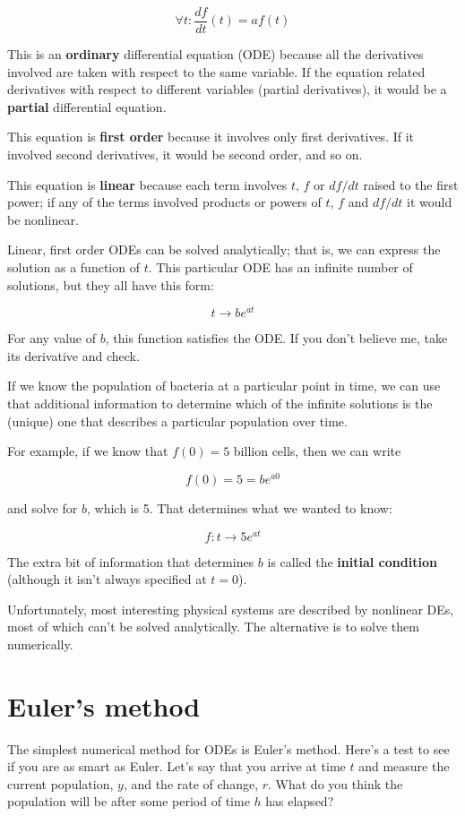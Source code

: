 \[ \forall t: \frac{df}{dt}(t) = a f(t) \]

This is an {\bf ordinary} differential equation (ODE) because all the
derivatives involved are taken with respect to the
same variable. If the equation related derivatives with respect to
different variables (partial derivatives), it would be a {\bf partial}
differential equation.

This equation is {\bf first order} because it involves only first
derivatives. If it involved second derivatives, it would be second order,
and so on.

This equation is {\bf linear} because each term involves $t$, $f$ or
$df/dt$ raised to the first power; if any of the terms involved
products or powers of $t$, $f$ and $df/dt$ it would be
nonlinear.

Linear, first order ODEs can be solved analytically; that is, we
can express the solution as a function of $t$.
This particular ODE has an infinite number of solutions, but
they all have this form:

\[ t \to b e^{at} \]

For any value of $b$, this function satisfies the ODE. If you don't
believe me, take its derivative and check.

If we know the population of bacteria at a particular point in time,
we can use that additional information to determine which of the
infinite solutions is the (unique) one that describes a particular
population over time.

For example, if we know that $f(0) = 5$ billion cells, then we
can write

\[ f(0) = 5 = b e^{a 0} \]

and solve for $b$, which is 5. That determines what we wanted
to know:

\[ f : t \to 5 e^{at} \]

The extra bit of information that determines $b$ is called
the {\bf initial condition} (although it isn't always specified
at $t=0$).

Unfortunately, most interesting physical systems are described by
nonlinear DEs, most of which can't be solved analytically. The
alternative is to solve them numerically.


\section{Euler's method}

The simplest numerical method for ODEs is Euler's method. Here's a
test to see if you are as smart as Euler. Let's say that you
arrive at time $t$ and measure the current population, $y$, and
the rate of change, $r$. What do you think the population will
be after some period of time $h$ has elapsed?

